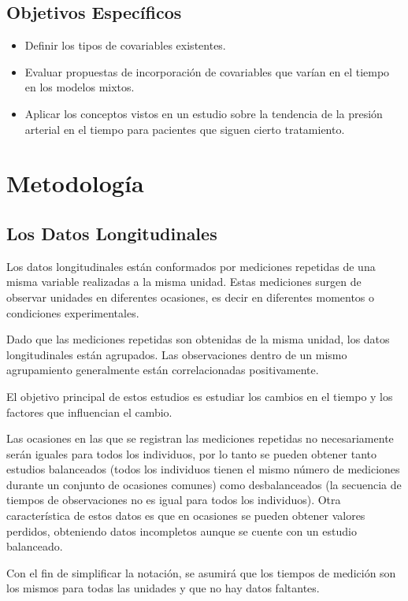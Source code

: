 \documentclass[spanish]{article}
\numberwithin{figure}{subsection}
\numberwithin{equation}{subsection}
\numberwithin{table}{subsection}
\begin{document}
\subsection{Objetivos Específicos}

\begin{itemize}
	\item Definir los tipos de covariables existentes.
	\item Evaluar propuestas de incorporación de covariables que varían en el
	tiempo en los modelos mixtos.
	\item Aplicar los conceptos vistos en un estudio sobre la tendencia de la
		  presión arterial en el tiempo para pacientes que siguen cierto
		  tratamiento.
\end{itemize}

\newpage
\section{Metodología}

\subsection{Los Datos Longitudinales}

Los datos longitudinales están conformados por mediciones repetidas de una
misma variable realizadas a la misma unidad. Estas mediciones surgen de
observar unidades en diferentes ocasiones, es decir en diferentes momentos o
condiciones experimentales.

Dado que las mediciones repetidas son obtenidas de la misma unidad, los datos
longitudinales están agrupados. Las observaciones dentro de un mismo
agrupamiento generalmente están correlacionadas positivamente.

El objetivo principal de estos estudios es estudiar los cambios en el tiempo y
los factores que influencian el cambio. 

Las ocasiones en las que se registran las mediciones repetidas no
necesariamente serán iguales para todos los individuos, por lo tanto se pueden
obtener tanto estudios balanceados (todos los individuos tienen el mismo número
de mediciones durante un conjunto de ocasiones comunes) como desbalanceados (la
secuencia de tiempos de observaciones no es igual para todos los individuos).
Otra característica de estos datos es que en ocasiones se pueden obtener
valores perdidos, obteniendo datos incompletos aunque se cuente con un estudio
balanceado.

Con el fin de simplificar la notación, se asumirá que los tiempos de medición
son los mismos para todas las unidades y que no hay datos faltantes.
\end{document}
